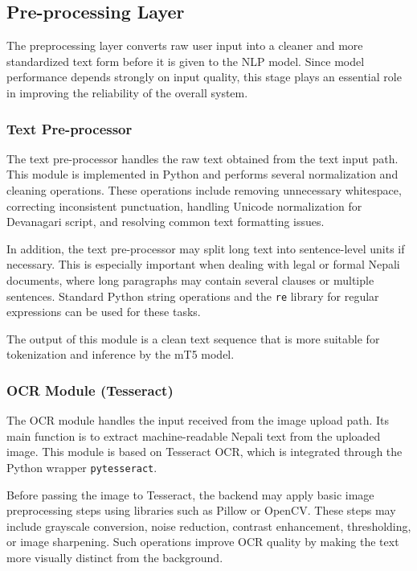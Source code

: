 \documentclass[12pt]{report}
\begin{document}
\subsection{Pre-processing Layer}

The preprocessing layer converts raw user input into a cleaner and more standardized text form before it is given to the NLP model. Since model performance depends strongly on input quality, this stage plays an essential role in improving the reliability of the overall system.

\subsubsection{Text Pre-processor}

The text pre-processor handles the raw text obtained from the text input path. This module is implemented in Python and performs several normalization and cleaning operations. These operations include removing unnecessary whitespace, correcting inconsistent punctuation, handling Unicode normalization for Devanagari script, and resolving common text formatting issues.

In addition, the text pre-processor may split long text into sentence-level units if necessary. This is especially important when dealing with legal or formal Nepali documents, where long paragraphs may contain several clauses or multiple sentences. Standard Python string operations and the \texttt{re} library for regular expressions can be used for these tasks.

The output of this module is a clean text sequence that is more suitable for tokenization and inference by the mT5 model.

\subsubsection{OCR Module (Tesseract)}

The OCR module handles the input received from the image upload path. Its main function is to extract machine-readable Nepali text from the uploaded image. This module is based on Tesseract OCR, which is integrated through the Python wrapper \texttt{pytesseract}.

Before passing the image to Tesseract, the backend may apply basic image preprocessing steps using libraries such as Pillow or OpenCV. These steps may include grayscale conversion, noise reduction, contrast enhancement, thresholding, or image sharpening. Such operations improve OCR quality by making the text more visually distinct from the background.
\end{document}
